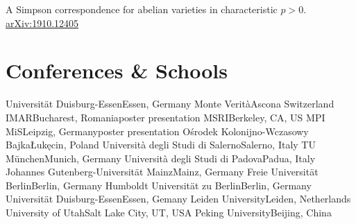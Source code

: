 \documentclass[10pt,a4paper]{moderncv}
\begin{document}
{A Simpson correspondence for abelian varieties in characteristic $p>0$.
\href{http://arxiv.org/abs/1910.12405}{arXiv:1910.12405}}


\section{Conferences \& Schools}

    {Universität Duisburg-Essen}{Essen, Germany}{}
    {Monte Verit\`a}{Ascona Switzerland}{}
    {IMAR}{Bucharest, Romania}{poster presentation}
    {MSRI}{Berkeley, CA, US}
    {}
    {MPI MiS}{Leipzig, Germany}{poster presentation}
    {Ośrodek Kolonijno-Wczasowy Bajka}{Łukęcin, Poland}{}
    {Università degli Studi di Salerno}{Salerno, Italy}{}
    {TU München}{Munich, Germany}{}
    {Università degli Studi di Padova}{Padua, Italy}{}
    {Johannes Gutenberg-Universität Mainz}{Mainz, Germany}{}
    {Freie Universität Berlin}{Berlin, Germany}{}
    {Humboldt Universität zu Berlin}{Berlin, Germany}{}
    {Universität Duisburg-Essen}{Essen, Gemany}{}
    {Leiden University}{Leiden, Netherlands}{}
    {University of Utah}{Salt Lake City, UT, USA}{}
    {Peking University}{Beijing, China}{}
\end{document}
